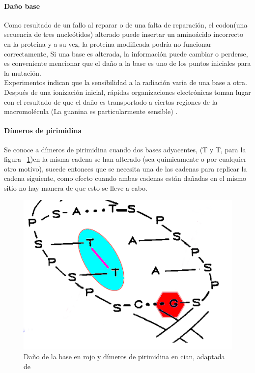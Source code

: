 \paragraph{Daño base}

Como resultado de un fallo al reparar o de una falta de reparación, el codon(una secuencia de tres nucleótidos) alterado puede insertar un aminoácido incorrecto en la proteína y a su vez, la proteína modificada podría no funcionar correctamente, Si una base es alterada, la información puede cambiar o perderse, es conveniente mencionar que el daño a la base es uno de los puntos iniciales para la mutación. \\
Experimentos indican que la sensibilidad a la radiación varia de una base a otra. Después de una ionización inicial, rápidas organizaciones electrónicas toman lugar con el resultado de que el daño es transportado a ciertas regiones de la macromolécula (La guanina es particularmente sensible) \cite{Thormod}.

\paragraph{Dímeros de pirimidina}

Se conoce a dímeros de pirimidina cuando dos bases adyacentes, (T y T, para la figura ~\ref{fig:dbdi})en la misma cadena se han alterado (sea químicamente o por cualquier otro motivo),  sucede entonces  que se necesita una de las cadenas para replicar la cadena siguiente, como efecto cuando ambas cadenas están dañadas en el mismo sitio no hay manera de que esto se lleve a cabo.

\begin{figure}[htbp]
    \centering
    \includegraphics[width=0.5\linewidth]{./Figures/base-piri.png}
    \caption[Esquema Daño base y Dímeros]{ Daño de la base en rojo y dímeros de pirimidina en cian, adaptada de \cite{Thormod}}
    \label{fig:dbdi}
\end{figure}

